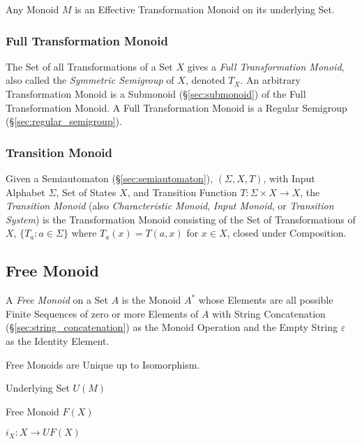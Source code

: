 Any Monoid $M$ is an Effective Transformation Monoid on its underlying
Set.



\subsubsection{Full Transformation Monoid}\label{sec:full_transformation}

The Set of all Transformations of a Set $X$ gives a \emph{Full
  Transformation Monoid}, also called the \emph{Symmetric Semigroup}
of $X$, denoted $T_X$. An arbitrary Transformation Monoid is a
Submonoid (\S\ref{sec:submonoid}) of the Full Transformation Monoid. A
Full Transformation Monoid is a Regular Semigroup
(\S\ref{sec:regular_semigroup}).



\subsubsection{Transition Monoid}\label{sec:transition_monoid}

Given a Semiautomaton (\S\ref{sec:semiautomaton}), $(\Sigma, X, T)$,
with Input Alphabet $\Sigma$, Set of States $X$, and Transition
Function $T : \Sigma \times X \rightarrow X$, the \emph{Transition
  Monoid} (also \emph{Characteristic Monoid}, \emph{Input Monoid}, or
\emph{Transition System}) is the Transformation Monoid consisting of
the Set of Transformations of $X$, $\{T_a : a \in \Sigma\}$ where
$T_a(x) = T(a,x)$ for $x \in X$, closed under Composition.



\subsection{Free Monoid}\label{sec:free_monoid}

A \emph{Free Monoid} on a Set $A$ is the Monoid $A^*$ whose Elements
are all possible Finite Sequences of zero or more Elements of $A$ with
String Concatenation (\S\ref{sec:string_concatenation}) as the Monoid
Operation and the Empty String $\varepsilon$ as the Identity Element.

Free Monoids are Unique up to Isomorphism.

Underlying Set $U(M)$

Free Monoid $F(X)$

$i_X : X \rightarrow U F (X)$

